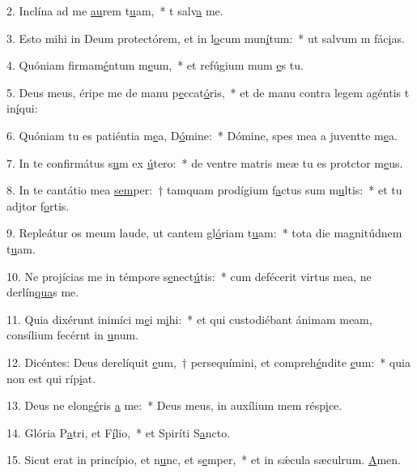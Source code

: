 2. Inclína ad me \uline{au}rem t\uline{u}am,~* t salv\uline{a} me.\par 
3. Esto mihi in Deum protectórem, et in l\uline{o}cum mun\uline{í}tum:~* ut salvum m fác\uline{i}as.\par 
4. Quóniam firmam\uline{é}ntum m\uline{e}um,~* et refúgium mum \uline{e}s tu.\par 
5. Deus meus, éripe me de manu p\uline{e}ccat\uline{ó}ris,~* et de manu contra legem agéntis t in\uline{í}qui:\par 
6. Quóniam tu es patiéntia m\uline{e}a, D\uline{ó}mine:~* Dómine, spes mea a juventte m\uline{e}a.\par 
7. In te confirmátus s\uline{u}m ex \uline{ú}tero:~* de ventre matris meæ tu es protctor m\uline{e}us.\par 
8. In te cantátio mea \uline{sem}per:~† tamquam prodígium f\uline{a}ctus sum m\uline{u}ltis:~* et tu adjtor f\uline{o}rtis.\par 
9. Repleátur os meum laude, ut cantem gl\uline{ó}riam t\uline{u}am:~* tota die magnitúdnem t\uline{u}am.\par 
10. Ne projícias me in témpore s\uline{e}nect\uline{ú}tis:~* cum defécerit virtus mea, ne derlín\uline{qua}s me.\par 
11. Quia dixérunt inimíci m\uline{e}i m\uline{i}hi:~* et qui custodiébant ánimam meam, consílium fecérnt in \uline{u}num.\par 
12. Dicéntes: Deus derelíquit \uline{e}um,~† persequímini, et compreh\uline{é}ndite \uline{e}um:~* quia non est qui ríp\uline{i}at.\par 
13. Deus ne elong\uline{é}ris \uline{a} me:~* Deus meus, in auxílium mem résp\uline{i}ce.\par 
14. Glória P\uline{a}tri, et F\uline{í}lio,~* et Spiríti S\uline{a}ncto.\par 
15. Sicut erat in princípio, et n\uline{u}nc, et s\uline{e}mper,~* et in sǽcula sæculrum. \uline{A}men.\par 
